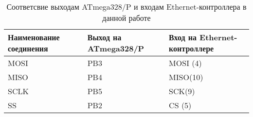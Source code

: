 \begin{table}[h!]
\caption{Соответсвие выходам ATmega328/P и входам Ethernet-контроллера в данной работе}
\label{connection}
	\begin{tabular}{|p{40mm}|p{40mm}|p{40mm}|}
\hline
	Наименование соединения & Выход на ATmega328/P & Вход на Ethernet-контроллере \\
\hline
		MOSI & PB3 & MOSI (4)\\
\hline
		MISO & PB4 & MISO(10)\\
\hline
		SCLK & PB5 & SCK(9)\\
\hline
		SS & PB2 & CS (5)\\
\hline
\end{tabular}
\end{table}


